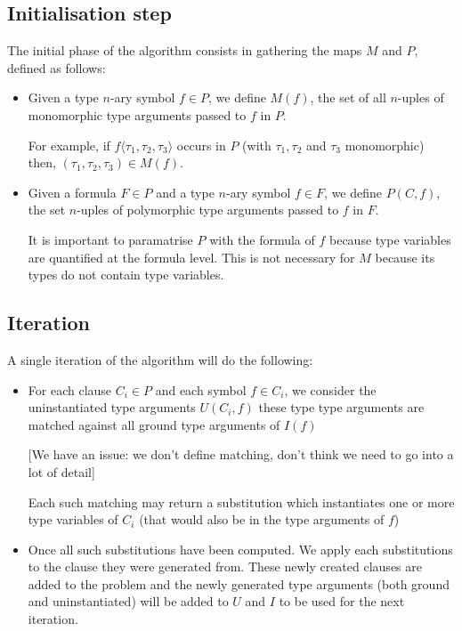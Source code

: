 \documentclass[]{ceurart}
\begin{document}
\subsection{Initialisation step}
The initial phase of the algorithm consists in gathering the maps \(M\) and \(P\), defined as follows:
\begin{itemize}
    \item Given a type \(n\)-ary symbol \(f \in P\), we define \(M(f)\), the set of all \(n\)-uples of monomorphic type arguments passed to \(f\) in \(P\).

    For example, if \(f\langle \tau_1, \tau_2, \tau_3\rangle\) occurs in \(P\) (with \(\tau_1, \tau_2\) and \( \tau_3\) monomorphic) then, \((\tau_1, \tau_2, \tau_3) \in M(f) \).

 \item Given a formula \(F \in P\) and a type \(n\)-ary symbol \(f \in F\), we define \(P(C, f)\), the set \(n\)-uples of polymorphic type arguments passed to \(f\) in \(F\). 

    It is important to paramatrise \(P\) with the formula of \(f\) because type variables are quantified at the formula level. This is not necessary for \(M\) because its types do not contain type variables.

\end{itemize}

\subsection{Iteration}
A single iteration of the algorithm will do the following:

\begin{itemize}
   \item For each clause \(C_i \in P\) and each symbol \(f \in C_i\), we consider the uninstantiated type arguments \(U(C_i, f)\) these type type arguments are matched against all ground type arguments of \(I(f)\)

      [We have an issue: we don't define matching, don't think we need to go into a lot of detail]

      Each such matching may return a substitution which instantiates one or more type variables of \(C_i\) (that would also be in the type arguments of \(f\))

   \item Once all such substitutions have been computed. We apply each substitutions to the clause they were generated from. These newly created clauses are added to the problem and the newly generated type arguments (both ground and uninstantiated) will be added to \(U\) and \(I\) to be used for the next iteration.
\end{itemize}
\end{document}
